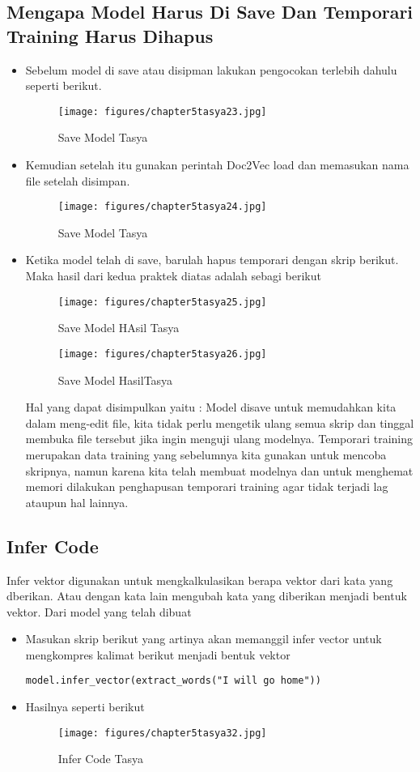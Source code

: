 \subsection{Mengapa Model Harus Di Save Dan Temporari Training Harus Dihapus}
\begin{itemize}
\item Sebelum model di save atau disipman lakukan pengocokan terlebih dahulu seperti berikut.
\begin{figure}[ht]
\centering
\texttt{[image: figures/chapter5tasya23.jpg]}
\caption{Save Model Tasya}
\label{Praktek}
\end{figure}
\item Kemudian setelah itu gunakan perintah Doc2Vec load dan memasukan nama file setelah disimpan.
\begin{figure}[ht]
\centering
\texttt{[image: figures/chapter5tasya24.jpg]}
\caption{Save Model Tasya}
\label{Praktek}
\end{figure}
\item Ketika model telah di save, barulah hapus temporari dengan skrip berikut. Maka hasil dari kedua praktek diatas adalah sebagi berikut
\begin{figure}[ht]
\centering
\texttt{[image: figures/chapter5tasya25.jpg]}
\caption{Save Model HAsil Tasya}
\label{Praktek}
\end{figure}
\begin{figure}[ht]
\centering
\texttt{[image: figures/chapter5tasya26.jpg]}
\caption{Save Model  HasilTasya}
\label{Praktek}
\end{figure}

Hal yang dapat disimpulkan yaitu :
Model disave untuk memudahkan kita dalam meng-edit file, kita tidak perlu mengetik ulang semua skrip dan tinggal membuka file tersebut jika ingin menguji ulang modelnya.
Temporari training merupakan data training yang sebelumnya kita gunakan untuk mencoba skripnya, namun karena kita telah membuat modelnya dan untuk menghemat memori dilakukan penghapusan temporari training agar tidak terjadi lag ataupun hal lainnya.
\end{itemize}


\subsection{Infer Code}
Infer vektor digunakan untuk mengkalkulasikan berapa vektor dari kata yang dberikan. Atau dengan kata lain mengubah kata yang diberikan menjadi bentuk vektor. Dari model yang telah dibuat
\begin{itemize}
\item Masukan skrip berikut yang artinya akan memanggil infer vector untuk mengkompres kalimat berikut menjadi bentuk vektor
\begin{verbatim}
model.infer_vector(extract_words("I will go home"))
\end{verbatim}
\item Hasilnya seperti berikut
\begin{figure}[ht]
\centering
\texttt{[image: figures/chapter5tasya32.jpg]}
\caption{Infer Code Tasya}
\label{Praktek}
\end{figure}
\end{itemize}


